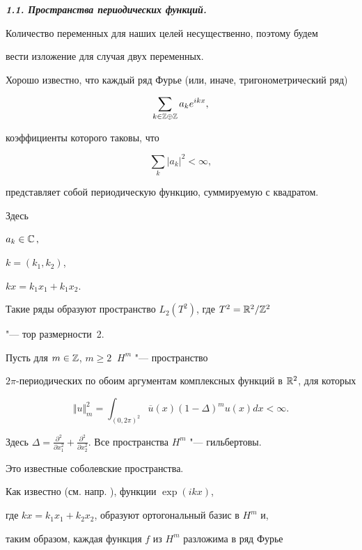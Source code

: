 \hypertarget{bur.1.1}{}



{\bf \itshape 1.1. Пространства периодических функций.}

Количество переменных для наших целей несущественно, поэтому будем

вести изложение для случая двух переменных.



Хорошо известно, что каждый ряд Фурье (или, иначе, тригонометрический ряд) 

$$ \sum\limits_{k \in {\Bbb Z}

\oplus {\Bbb Z}} a_k e^{i k x},$$

коэффициенты которого таковы, что 

$$\sum_k |a_k|^2 < \infty,$$

представляет собой периодическую функцию, суммируемую с квадратом. \linebreak

Здесь 

$a_k \in {\Bbb C\,},$ 

$ k = (k_1, k_2)$,

$k x = k_1 x_1 + k_1 x_2.$

Такие ряды образуют пространство $L_2(T^2)$, где $T^2={\Bbb R}^2/{\Bbb Z}^2$

"--- тор размерности~2.



Пусть для $m \in {\Bbb Z}$, $m\ge2\ $ $H^m$ "--- пространство

$2\pi$-периодических по обоим аргументам комплексных функций в ${\Bbb R}^2$, для которых

$$

\Vert u \Vert_m^2 = \int_{(0, 2 \pi)^2} \overline u (x)

(1 - \Delta)^m u (x) d x < \infty.

$$

Здесь $\Delta = \frac {\partial^2}{\partial x_1^2} + \frac

{\partial^2}{\partial x_2^2}$. Все пространства $H^m$ "--- гильбертовы.

Это известные соболевские пространства.



Как известно (см. напр. \cite{bur:1}), функции $\exp ( i k x)$, 

где $k x = k_1 x_1 + k_2 x_2$, образуют ортогональный базис в $H^m$ и,

таким образом, каждая функция $f$ из $H^m$ разложима в ряд Фурье 

